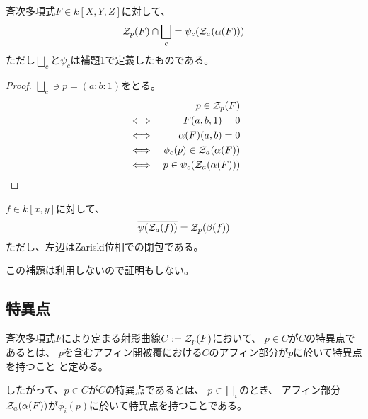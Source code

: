 \documentclass[a4paper]{jsarticle}
\begin{document}
    \begin{Prop}
        斉次多項式$F \in k[X, Y, Z]$に対して、
        \[ \mathcal{Z}_p(F) \cap \bigsqcup_c = \psi_c(\mathcal{Z}_a(\alpha(F)))\]
        ただし$\bigsqcup_c$と$\psi_c$は補題1で定義したものである。
    \end{Prop}
    \begin{proof}
        $\bigsqcup_c \ni p=(a : b : 1)$をとる。
        \begin{eqnarray*}
            &{}&    p \in \mathcal{Z}_p(F) \\
            &\iff&  F(a,b,1)=0 \\
            &\iff&  \alpha(F)(a,b)=0 \\
            &\iff&  \phi_c(p) \in \mathcal{Z}_a(\alpha(F)) \\
            &\iff&  p \in \psi_c(\mathcal{Z}_a(\alpha(F))) \\
        \end{eqnarray*}
        
    \end{proof}

    \begin{Lemma}
        $f \in k[x, y]$に対して、
        \[ \overline{\psi(\mathcal{Z}_a(f))}=\mathcal{Z}_p(\beta(f)) \]
        ただし、左辺はZariski位相での閉包である。
    \end{Lemma}
    この補題は利用しないので証明もしない。

\subsection{特異点}
    \begin{Def}[射影曲線の特異点]
        斉次多項式$F$により定まる射影曲線$C:=\mathcal{Z}_p(F)$において、
        $p \in C$が$C$の特異点であるとは、
        $p$を含むアフィン開被覆における$C$のアフィン部分が$p$に於いて特異点を持つこと
        と定める。

        したがって、$p \in C$が$C$の特異点であるとは、
        $p \in \bigsqcup_i$のとき、
        アフィン部分$\mathcal{Z}_a(\alpha(F))$が$\phi_i(p)$に於いて特異点を持つことである。
    \end{Def}
\end{document}
